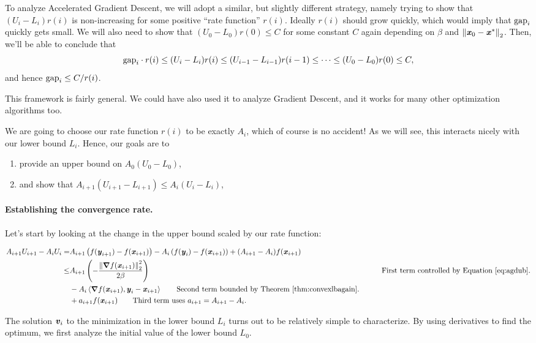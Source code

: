 To analyze Accelerated Gradient Descent, we will adopt a similar, but
slightly different strategy, namely trying to show that $(U_i - L_i) r(i)$
is non-increasing for some positive ``rate function'' $r(i)$. Ideally $r(i)$ should
grow quickly, which would imply that $\text{gap}_i$ quickly gets small.
We will also need to show that $(U_0 - L_0) r(0) \leq C$ for some constant
$C$ again depending on $\beta$ and $\left\| \boldsymbol{\mathit{x}}_0 - \boldsymbol{\mathit{x}}^* \right\|_2$.
%
Then, we'll be able to conclude that
\[
\text{gap}_i \cdot r(i) \leq (U_i - L_i) r(i) \leq (U_{i-1} - L_{i-1}) r(i-1) \leq
\cdots \leq (U_0 - L_0) r(0) \leq C,
\]
and hence $\text{gap}_i \leq C/r(i)$.

This framework is fairly general. We could have also used it to
analyze Gradient Descent, and it works for many other optimization
algorithms too.

We are going to choose our rate function $r(i)$ to be exactly $A_i$,
which of course is no accident!
As we will see, this interacts nicely with our lower
bound $L_i$.
Hence, our goals are to
\begin{enumerate}
\item provide an upper bound on $A_0 (U_0 - L_0)$,
\item and show that $A_{i+1} (U_{i+1} - L_{i+1})  \leq A_{i} (U_{i} - L_{i}) $,
\end{enumerate}

\paragraph{Establishing the convergence rate.}
Let's start by looking at the change in the upper bound scaled by our
rate function:

\begin{align}
 \label{eq:ubgap}
 A_{i+1}U_{i+1} - A_i U_i
 =&
 A_{i+1}\left( f(\yy_{i+1}) - f(\xx_{i+1}) \right)
 -
 A_{i}\left( f(\yy_{i}) - f(\xx_{i+1}) \right)
 +
 (A_{i+1}-A_{i}) f(\xx_{i+1})
\\
\leq &
    A_{i+1}\left(
    - \frac{\norm{\grad  f(\xx_{i+1})}_2^2}{2\beta}
      \right)
      & \tag*{First term controlled by Equation~\eqref{eq:agdub}.}
 \\
 &-
    A_{i}
   \ip{\grad f(\xx_{i+1}), \yy_{i} - \xx_{i+1}  }
   \tag*{Second term bounded by Theorem~\ref{thm:convexlbagain}.}
 \\
  &+ a_{i+1} f(\xx_{i+1})
    \tag*{Third term uses $a_{i+1} = A_{i+1}-A_{i}$.}
\end{align}

The solution $\boldsymbol{\mathit{v}}_i$ to the minimization in the lower bound $L_i$
turns out to be relatively simple to characterize.
By using derivatives to find the optimum, we first analyze the initial
value of the lower bound $L_0$.

